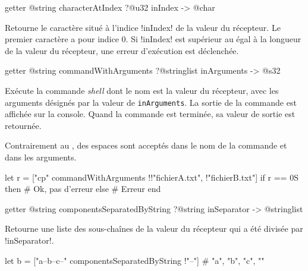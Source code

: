 
\begin{galgas4box}
getter @string characterAtIndex ?@u32 inIndex -> @char
\end{galgas4box}

Retourne le caractère situé à l'indice \ggsq!inIndex! de la valeur du récepteur. Le premier caractère a pour indice $0$. Si \ggsq!inIndex! est supérieur au égal à la longueur de la valeur du récepteur, une erreur d'exécution est déclenchée.












\begin{galgas4box}
getter @string commandWithArguments ?@stringlist inArguments -> @s32
\end{galgas4box}
Exécute la commande \emph{shell} dont le nom est la valeur du récepteur, avec les arguments désignés par la valeur de \texttt{inArguments}. La sortie de la commande est affichée sur la console. Quand la commande est terminée, sa valeur de sortie est retournée.

Contrairement au , des espaces sont acceptés dans le nom de la commande et dans les arguments.

\begin{galgas4}
let r = ["cp" commandWithArguments !{!"fichierA.txt", !"fichierB.txt"}]
if r == 0S then
  # Ok, pas d'erreur
else
  # Erreur
end
\end{galgas4}
















\begin{galgas4box}
getter @string componentsSeparatedByString ?@string inSeparator -> @stringlist
\end{galgas4box}
Retourne une liste des sous-chaînes de la valeur du récepteur qui a été divisée par \ggsq!inSeparator!.

\begin{galgas4}
let b = ["a--b--c--" componentsSeparatedByString !"--"]
# "a", "b", "c", ""
\end{galgas4}












